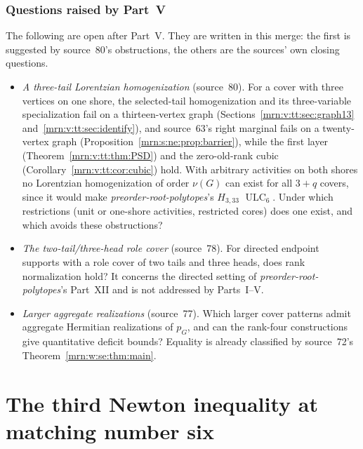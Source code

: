 \documentclass[11pt,a4paper]{article}
\theoremstyle{remark}\newtheorem{remark}[theorem]{Remark}
\newcommand{\ULC}{\operatorname{ULC}}      %
\newcommand{\prp}{\emph{preorder-root-polytopes}}
\begin{document}
\section{Questions raised by Part~V}\label{mrn:v:sec:questions}
The following are open after Part~V. They are written in this merge: the
first is suggested by source~80's obstructions, the others are the sources'
own closing questions.
\begin{itemize}
\item \emph{A three-tail Lorentzian homogenization} (source~80). For a cover
  with three vertices on one shore, the selected-tail homogenization and its
  three-variable specialization fail on a thirteen-vertex graph
  (Sections~\ref{mrn:v:tt:sec:graph13} and~\ref{mrn:v:tt:sec:identify}), and
  source~63's right marginal fails on a twenty-vertex graph
  (Proposition~\ref{mrn:s:ne:prop:barrier}), while the first layer
  (Theorem~\ref{mrn:v:tt:thm:PSD}) and the zero-old-rank cubic
  (Corollary~\ref{mrn:v:tt:cor:cubic}) hold. With arbitrary activities on
  both shores no Lorentzian homogenization of order $\nu(G)$ can exist for
  all $3+q$ covers, since it would make \prp's $H_{3,33}$ $\ULC_6$. Under
  which restrictions (unit or one-shore activities, restricted cores) does
  one exist, and which avoids these obstructions?
\item \emph{The two-tail/three-head role cover} (source~78). For directed
  endpoint supports with a role cover of two tails and three heads, does rank
  normalization hold? It concerns the directed setting of \prp's Part~XII and
  is not addressed by Parts~I--V.
\item \emph{Larger aggregate realizations} (source~77). Which larger cover
  patterns admit aggregate Hermitian realizations of $p_G$, and can the
  rank-four constructions give quantitative deficit bounds? Equality is
  already classified by source~72's Theorem~\ref{mrn:w:se:thm:main}.
\end{itemize}


\clearpage
\part{The third Newton inequality at matching number six}\label{mrn:part:six}
\end{document}
